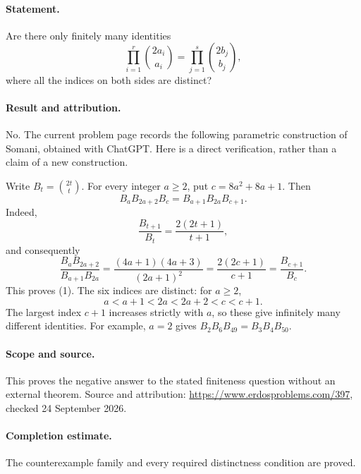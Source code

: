 \paragraph{Statement.}
Are there only finitely many identities
\[
 \prod_{i=1}^{r}\binom{2a_i}{a_i}
 =
 \prod_{j=1}^{s}\binom{2b_j}{b_j},
\]
where all the indices on both sides are distinct?

\paragraph{Result and attribution.}
No. The current problem page records the following parametric construction of
Somani, obtained with ChatGPT. Here is a direct verification, rather than a
claim of a new construction.

Write \(B_t=\binom{2t}{t}\). For every integer \(a\geq2\), put
\(c=8a^2+8a+1\). Then
\[
 B_a B_{2a+2}B_c=B_{a+1}B_{2a}B_{c+1}.
 \tag{1}
\]
Indeed,
\[
 \frac{B_{t+1}}{B_t}=\frac{2(2t+1)}{t+1},
\]
and consequently
\[
 \frac{B_aB_{2a+2}}{B_{a+1}B_{2a}}
 =\frac{(4a+1)(4a+3)}{(2a+1)^2}
 =\frac{2(2c+1)}{c+1}
 =\frac{B_{c+1}}{B_c}.
\]
This proves (1). The six indices are distinct: for \(a\geq2\),
\[
 a<a+1<2a<2a+2<c<c+1.
\]
The largest index \(c+1\) increases strictly with \(a\), so these give
infinitely many different identities. For example, \(a=2\) gives
\(B_2B_6B_{49}=B_3B_4B_{50}\).

\paragraph{Scope and source.}
This proves the negative answer to the stated finiteness question without an
external theorem. Source and attribution:
\url{https://www.erdosproblems.com/397}, checked 24 September 2026.

\paragraph{Completion estimate.}
The counterexample family and every required distinctness condition are proved.
